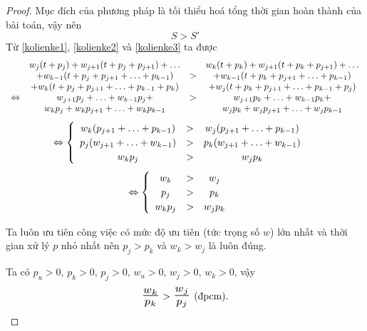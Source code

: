 \documentclass[12pt,a4paper]{report}
\begin{document}
\begin{proof}
	Mục đích của phương pháp là tối thiểu hoá tổng thời gian hoàn thành của bài toán, vậy nên
	\begin{equation} \label{kolienke3}
		S > S'
	\end{equation}
	Từ \eqref{kolienke1}, \eqref{kolienke2} và \eqref{kolienke3} ta được
        \begin{equation*}
        \begin{array}{c c c c}
		& w_j(t+p_j) + w_{j+1} (t + p_j + p_{j+1}) + \ldots && w_k(t+p_k) + w_{j+1} (t + p_k + p_{j+1}) + \ldots \\
		& + w_{k-1}(t + p_j  + p_{j+1} + \ldots +p_{k-1}) &>& + w_{k-1}(t + p_k  + p_{j+1} + \ldots +p_{k-1})\\
		& + w_k(t + p_j + p_{j+1} + \ldots +p_{k-1} + p_k) &&  + w_j(t + p_k + p_{j+1} + \ldots +p_{k-1} + p_j)
		\\
		\Leftrightarrow & w_{j+1}p_j + \ldots + w_{k-1}p_j + &>& w_{j+1}p_k + \ldots + w_{k-1}p_k + \\
		& w_kp_j + w_kp_{j+1} + \ldots + w_kp_{k-1} && w_jp_k + w_jp_{j+1} + \ldots + w_jp_{k-1} \\
        \end{array}
        \end{equation*}
		\begin{equation*}
			\Leftrightarrow
			  \begin{cases}
				\begin{array}{c c c}
					w_k (p_{j+1}+\ldots + p_{k-1}) &>& w_j(p_{j+1}+\ldots + p_{k-1}) \\
					p_j(w_{j+1}+\ldots + w_{k-1}) &>& p_k (w_{j+1}+\ldots + w_{k-1}) \\
					w_kp_j &>& w_jp_k
				\end{array}
			  \end{cases}       
		  \end{equation*}
		\begin{equation*}
			\Leftrightarrow
			  \begin{cases}
				\begin{array}{c c c}
					w_k &>& w_j \\
					p_j &>& p_k \\
					w_kp_j &>& w_jp_k
				\end{array}
			  \end{cases}       
		  \end{equation*}
		
		Ta luôn ưu tiên công việc có mức độ ưu tiên (tức trọng số $w$) lớn nhất và thời gian xử lý $p$ nhỏ nhất nên $p_j > p_k$ và $w_k > w_j$ là luôn đúng.
		
		Ta có $p_u > 0$, $ p_k>0$, $p_j > 0$, $w_u>0$, $w_j>0$, $w_k >0$, vậy
		\begin{equation}
			\scalebox{1.5}{$\frac{w_k}{p_k}$} > \scalebox{1.5}{$\frac{w_j}{p_j}$} \text{ (đpcm).}
		\end{equation}
\end{proof}
\end{document}
